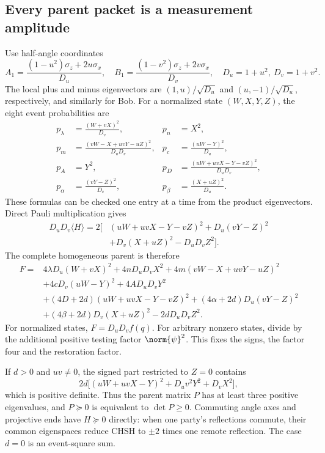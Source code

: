 \subsection{Every parent packet is a measurement amplitude}
Use half-angle coordinates
\[
A_1=\frac{(1-u^2)\sigma_z+2u\sigma_x}{D_u},\quad
B_1=\frac{(1-v^2)\sigma_z+2v\sigma_x}{D_v},\quad
D_u=1+u^2,\ D_v=1+v^2.
\]
The local plus and minus eigenvectors are $(1,u)/\sqrt{D_u}$ and $(u,-1)/\sqrt{D_u}$, respectively, and similarly for Bob. For a normalized state $(W,X,Y,Z)$, the eight event probabilities are
\begin{align*}
p_\lambda&=\frac{(W+vX)^2}{D_v},&p_n&=X^2,\\
p_m&=\frac{(vW-X+uvY-uZ)^2}{D_uD_v},&p_c&=\frac{(uW-Y)^2}{D_u},\\
p_A&=Y^2,&p_D&=\frac{(uW+uvX-Y-vZ)^2}{D_uD_v},\\
p_\alpha&=\frac{(vY-Z)^2}{D_v},&p_\beta&=\frac{(X+uZ)^2}{D_u}.
\end{align*}
These formulas can be checked one entry at a time from the product eigenvectors. Direct Pauli multiplication gives
\begin{align*}
D_uD_v\langle H\rangle=2\big[&(uW+uvX-Y-vZ)^2+D_u(vY-Z)^2\\
&+D_v(X+uZ)^2-D_uD_vZ^2\big].
\end{align*}
The complete homogeneous parent is therefore
\begin{align*}
F={}&4\lambda D_u(W+vX)^2+4nD_uD_vX^2
 +4m(vW-X+uvY-uZ)^2\\
&+4cD_v(uW-Y)^2+4AD_uD_vY^2\\
&+(4D+2d)(uW+uvX-Y-vZ)^2+(4\alpha+2d)D_u(vY-Z)^2\\
&+(4\beta+2d)D_v(X+uZ)^2-2dD_uD_vZ^2.\tag{P}\label{eq:parent}
\end{align*}
For normalized states, $F=D_uD_v f(q)$. For arbitrary nonzero states, divide by the additional positive testing factor $\norm{\psi}^2$. This fixes the signs, the factor four and the restoration factor.

If $d>0$ and $uv\ne0$, the signed part restricted to $Z=0$ contains
\[2d\big[(uW+uvX-Y)^2+D_uv^2Y^2+D_vX^2\big],\]
which is positive definite. Thus the parent matrix $P$ has at least three positive eigenvalues, and $P\succeq0$ is equivalent to $\det P\ge0$. Commuting angle axes and projective ends have $H\succeq0$ directly: when one party's reflections commute, their common eigenspaces reduce CHSH to $\pm2$ times one remote reflection. The case $d=0$ is an event-square sum.

